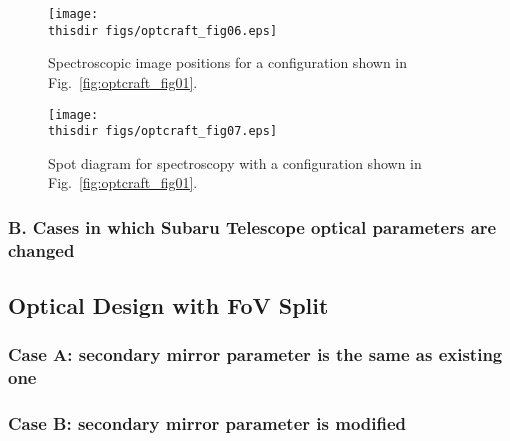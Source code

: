 \begin{figure}[!ht]
\centerline{
\texttt{[image: \\thisdir figs/optcraft\_fig06.eps]}
}
\caption{Spectroscopic image positions for a configuration shown in Fig.~\ref{fig:optcraft_fig01}.
}
\label{fig:optcraft_fig06}
\end{figure}

\begin{figure}[!ht]
\centerline{
\texttt{[image: \\thisdir figs/optcraft\_fig07.eps]}
}
\caption{Spot diagram for spectroscopy with a configuration shown in
 Fig.~\ref{fig:optcraft_fig01}.}
\label{fig:optcraft_fig07}
\end{figure}





\subsubsection{B. Cases in which Subaru Telescope optical parameters are
   changed}


\subsection{Optical Design with FoV Split}

\subsubsection{Case A: secondary mirror parameter is the same as
   existing one}

\subsubsection{Case B: secondary mirror parameter is modified}


